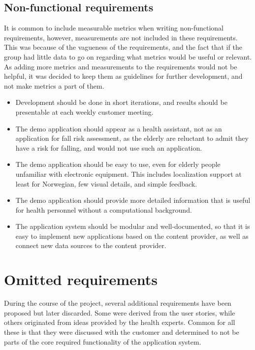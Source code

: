 \subsection{Non-functional requirements}
It is common to include measurable metrics when writing non-functional requirements, however, measurements are not included in these requirements. This was because of the vagueness of the requirements, and the fact that if the group had little data to go on regarding what metrics would be useful or relevant. As adding more metrics and measurements to the requirements would not be helpful, it was decided to keep them as guidelines for further development, and not make metrics a part of them.
\begin{itemize}
\item Development should be done in short iterations, and results should be presentable at each weekly customer meeting.
\item The demo application should appear as a health assistant, not as an application for fall risk assessment, as the elderly are reluctant to admit they have a risk for falling, and would not use such an application.
\item The demo application should be easy to use, even for elderly people unfamiliar with electronic equipment. This includes localization support at least for Norwegian, few visual details, and simple feedback.
\item The demo application should provide more detailed information that is useful for health personnel without a computational background.
\item The application system should be modular and well-documented, so that it is easy to implement new applications based on the content provider, as well as connect new data sources to the content provider.
\end{itemize}

\section{Omitted requirements} \label{expert_meeting_requirement}
During the course of the project, several additional requirements have been proposed but later discarded. Some were derived from the user stories, while others originated from ideas provided by the health experts. Common for all these is that they were discussed with the customer and determined to not be parts of the core required functionality of the application system.

